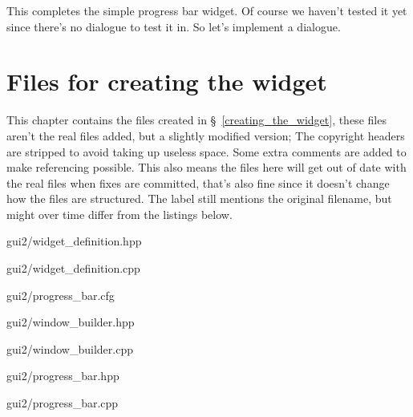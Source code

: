 \documentclass[a4paper,notitlepage]{report}
\begin{document}
This completes the simple progress bar widget. Of course we haven't tested it
yet since there's no dialogue to test it in. So let's implement a dialogue.

\begin{comment}

\section{Creating the window}

The window is normally split in 3 files. One .cpp/.hpp file and one WML file.
The dialogue used is the load progress dialogue, this is not the greatest
example dialogue, so this section may later use another dialogue as example.

\end{comment}

\appendix


\chapter{Files for creating the widget}

This chapter contains the files created in \S~\ref{creating_the_widget}, these
files aren't the real files added, but a slightly modified version; The
copyright headers are stripped to avoid taking up useless space. Some extra
comments are added to make referencing possible. This also means the files here
will get out of date with the real files when fixes are committed, that's also
fine since it doesn't change how the files are structured. The label still
mentions the original filename, but might over time differ from the listings
below.


	{gui2/widget_definition.hpp}

\pagebreak

	{gui2/widget_definition.cpp}

\pagebreak

	{gui2/progress_bar.cfg}

\pagebreak

	{gui2/window_builder.hpp}


	{gui2/window_builder.cpp}


	{gui2/progress_bar.hpp}

\pagebreak

	{gui2/progress_bar.cpp}
\end{document}
